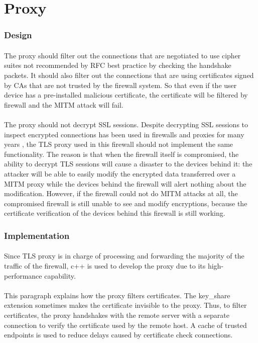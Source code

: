 \documentclass[mscthesis]{usiinfthesis}
\begin{document}
\section{Proxy}
\subsubsection{Design}
\paragraph{}
The proxy should filter out the connections that are negotiated to use cipher suites not recommended by RFC best practice by checking the handshake packets. It should also filter out the connections that are using certificates signed by CAs that are not trusted by the firewall system. So that even if the user device has a pre-installed malicious certificate, the certificate will be filtered by firewall and the MITM attack will fail.
\paragraph{}
The proxy should not decrypt SSL sessions. Despite decrypting SSL sessions to inspect encrypted connections has been used in firewalls and proxies for many years \citep{fortigate:deepinspection}, the TLS proxy used in this firewall should not implement the same functionality. The reason is that when the firewall itself is compromised, the ability to decrypt TLS sessions will cause a disaster to the devices behind it: the attacker will be able to easily modify the encrypted data transferred over a MITM proxy while the devices behind the firewall will alert nothing about the modification. However, if the firewall could not do MITM attacks at all, the compromised firewall is still unable to see and modify encryptions, because the certificate verification of the devices behind this firewall is still working.
\subsubsection{Implementation}
\paragraph{}
Since TLS proxy is in charge of processing and forwarding the majority of the traffic of the firewall, c++ is used to develop the proxy due to its high-performance capability.
\paragraph{}
This paragraph explains how the proxy filters certificates. The key\_share extension sometimes makes the certificate invisible to the proxy. Thus, to filter certificates, the proxy handshakes with the remote server with a separate connection to verify the certificate used by the remote host. A cache of trusted endpoints is used to reduce delays caused by certificate check connections.
\end{document}
